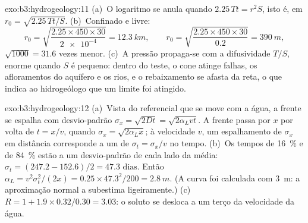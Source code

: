 \begin{solution}{exo:b3:hydrogeology:11}
(a)~O logaritmo se anula quando $2.25\,Tt = r^2S$, isto é, em $r_0 =
\sqrt{2.25\,Tt/S}$. (b)~Confinado e livre:
\[
r_0 = \sqrt{\frac{2.25\times450\times30}{\num{2e-4}}} = \qty{12.3}{km},
\qquad r_0 = \sqrt{\frac{2.25\times450\times30}{0.2}} = \qty{390}{m},
\]
$\sqrt{1000} = 31.6$ vezes menor. (c)~A pressão
propaga-se com a difusividade $T/S$, enorme quando $S$ é pequeno: dentro
do teste, o cone atinge falhas, os afloramentos do aquífero e os rios,
e o rebaixamento se afasta da reta, o que indica ao
hidrogeólogo que um limite foi atingido.
\end{solution}

\begin{solution}{exo:b3:hydrogeology:12}
(a)~Vista do referencial que se move com a água, a frente se espalha com
desvio-padrão $\sigma_x = \sqrt{2Dt} = \sqrt{2\alpha_Lvt}$. A frente passa
por $x$ por volta de $t = x/v$, quando $\sigma_x = \sqrt{2\alpha_Lx}$; à velocidade
$v$, um espalhamento de $\sigma_x$ em distância corresponde a um de $\sigma_t = \sigma_x/v$
no tempo. (b)~Os tempos de \qty{16}{\percent} e de \qty{84}{\percent} estão a um
desvio-padrão de cada lado da média: $\sigma_t = (247.2 -
152.6)/2 = \num{47.3}\text{ dias}$. Então $\alpha_L = v^2\sigma_t^2/(2x) =
0.25\times47.3^2/200 = \qty{2.8}{m}$. (A curva foi calculada com
\qty{3}{m}: a aproximação normal a subestima ligeiramente.) (c)~$R =
1 + 1.9\times0.32/0.30 = \num{3.03}$: o soluto se desloca a um terço da
velocidade da água.
\end{solution}

